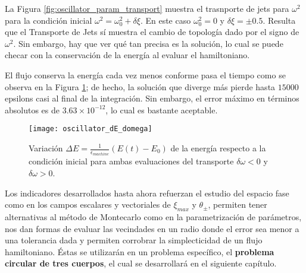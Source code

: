La Figura \ref{fig:oscillator_param_transport} muestra el trasnporte de jets para $\omega^2$ para la condición inicial $\omega^2 = \omega_0^2 + \delta \xi$. En este caso $\omega_0^2 = 0$ y $\delta\xi = \pm 0.5$. Resulta que el Transporte de Jets sí muestra el cambio de topología dado por el signo de $\omega^2$. Sin embargo, hay que ver qué tan precisa es la solución, lo cual se puede checar con la conservación de la energía al evaluar el hamiltoniano. 

El flujo conserva la energía cada vez menos conforme pasa el tiempo como se observa en la Figura \ref{fig:oscillator_dE_domega}; de hecho, la solución que diverge más pierde hasta $15000$ epsilons casi al final de la integración. Sin embargo, el error máximo en términos absolutos es de $3.63 \times 10^{-12}$, lo cual es bastante aceptable.

\begin{figure}[h!]
 \centering
 \texttt{[image: oscillator\_dE\_domega]}
 \caption{Variación $\Delta E = \frac{1}{\epsilon_{machine}} \left( E(t) - E_0 \right)$ de la energía respecto a la condición inicial para ambas evaluaciones del transporte $\delta \omega < 0$ y $\delta \omega > 0$.}
 \label{fig:oscillator_dE_domega}
\end{figure}


Los indicadores desarrollados hasta ahora refuerzan el estudio del espacio fase como en los campos escalares y vectoriales de $\xi_{max}$ y $\theta_{\pm}$, permiten tener alternativas al método de Montecarlo como en la parametrización de parámetros, nos dan formas de evaluar las vecindades en un radio donde el error sea menor a una tolerancia dada y permiten corrobrar la simplecticidad de un flujo hamiltoniano. Éstas se utilizarán en un problema específico, el \textbf{problema circular de tres cuerpos}, el cual se desarrollará en el siguiente capítulo.
